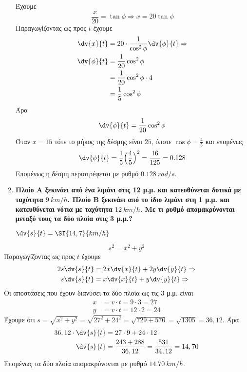 \begin{enumerate}
	Έχουμε
	\[
		\frac{x}{20}=\tan\phi \Rightarrow x=20\tan\phi
	\]
	Παραγωγίζοντας ως προς $t$ έχουμε
	\begin{align*}
		\dv{x}{t} &= 20\cdot \frac{1}{\cos^{2}\phi}\dv{\phi}{t} \notag \Rightarrow \\
		\dv{\phi}{t}&=\frac{1}{20}\cos^{2}\phi \\
					&=\frac{1}{20}\cos^{2}\phi\cdot 4 \\
					&=\frac{1}{5}\cos^{2}\phi
	\end{align*}
	Άρα
	\begin{equation} \label{eq:anglerate}
		\dv{\phi}{t}=\frac{1}{20}\cos^{2}\phi
\end{equation}
Όταν $x=15$ τότε το μήκος της δέσμης είναι $25$, όποτε $\cos\phi = \frac{4}{5}$ και επομένως
\[
	\dv{\phi}{t} = \frac{1}{5}\Bigl(\frac{4}{5}\Bigr)^{2} = \frac{16}{125} = 0.128
\]
Επομένως η δέσμη περιστρέφεται με ρυθμό $\SI{0.128}{rad/s}$.


	\item {\bfseries \boldmath Πλοίο Α ξεκινάει από ένα λιμάνι στις 12 μ.μ. και κατευθύνεται δυτικά
		με ταχύτητα  $\SI{9}{km/h}$. Πλοίο Β ξεκινάει από το ίδιο λιμάνι στη 1
		μ.μ. και κατευθύνεται νότια με ταχύτητα $\SI{12}{km/h}$. Με τι ρυθμό
	απομακρύνονται μεταξύ τους τα δύο πλοία στις 3 μ.μ.?}

		\hfill $ \dv{s}{t} = \SI{14,7}{km/h} $
\end{enumerate}



	\[
		s^{2} = x^{2} + y^{2}
	\]
	Παραγωγίζοντας ως προς $t$ έχουμε
	\begin{align*}
		2s \dv{s}{t} & = 2x\dv{x}{t} + 2y\dv{y}{t} \Rightarrow \\
		s \dv{s}{t} & = x\dv{x}{t} + y\dv{y}{t} \Rightarrow \\
	\end{align*}
	Οι αποστάσεις που έχουν διανύσει τα δύο πλοία ως τις $3$ μ.μ. είναι
	\begin{align*}
		x &= v\cdot t = 9 \cdot 3 = 27 \\
		y &= v\cdot t = 12 \cdot 2 = 24
	\end{align*}
	Έχουμε ότι $ s = \sqrt{x^{2} + y^{2}} = \sqrt{27^{2} + 24^{2}} =
	\sqrt{729 + 576} = \sqrt{1305} = 36,12$.
	Άρα 
	\begin{align}
		36,12 \cdot \dv{s}{t} &= 27\cdot 9 + 24 \cdot 12 \\
		\dv{s}{t} &= \frac{243 + 288}{36,12} = \frac{531}{34,12} = 14,70
	\end{align}
	Επομένως τα δύο πλοία απομακρύνονται με ρυθμό $\SI{14,70}{km/h}$.





   
